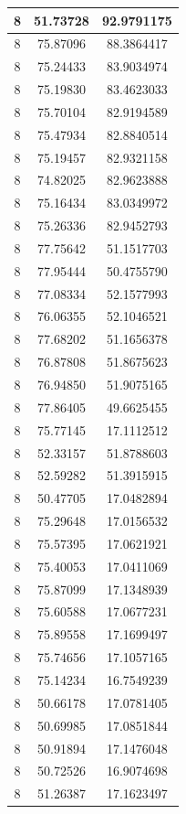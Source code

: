 \documentclass[
]{book}
\begin{document}
\begin{tabular}{c|c|c}
\hline
8 & 51.73728 & 92.9791175\\
\hline
8 & 75.87096 & 88.3864417\\
\hline
8 & 75.24433 & 83.9034974\\
\hline
8 & 75.19830 & 83.4623033\\
\hline
8 & 75.70104 & 82.9194589\\
\hline
8 & 75.47934 & 82.8840514\\
\hline
8 & 75.19457 & 82.9321158\\
\hline
8 & 74.82025 & 82.9623888\\
\hline
8 & 75.16434 & 83.0349972\\
\hline
8 & 75.26336 & 82.9452793\\
\hline
8 & 77.75642 & 51.1517703\\
\hline
8 & 77.95444 & 50.4755790\\
\hline
8 & 77.08334 & 52.1577993\\
\hline
8 & 76.06355 & 52.1046521\\
\hline
8 & 77.68202 & 51.1656378\\
\hline
8 & 76.87808 & 51.8675623\\
\hline
8 & 76.94850 & 51.9075165\\
\hline
8 & 77.86405 & 49.6625455\\
\hline
8 & 75.77145 & 17.1112512\\
\hline
8 & 52.33157 & 51.8788603\\
\hline
8 & 52.59282 & 51.3915915\\
\hline
8 & 50.47705 & 17.0482894\\
\hline
8 & 75.29648 & 17.0156532\\
\hline
8 & 75.57395 & 17.0621921\\
\hline
8 & 75.40053 & 17.0411069\\
\hline
8 & 75.87099 & 17.1348939\\
\hline
8 & 75.60588 & 17.0677231\\
\hline
8 & 75.89558 & 17.1699497\\
\hline
8 & 75.74656 & 17.1057165\\
\hline
8 & 75.14234 & 16.7549239\\
\hline
8 & 50.66178 & 17.0781405\\
\hline
8 & 50.69985 & 17.0851844\\
\hline
8 & 50.91894 & 17.1476048\\
\hline
8 & 50.72526 & 16.9074698\\
\hline
8 & 51.26387 & 17.1623497\\

\end{tabular}
\end{document}
